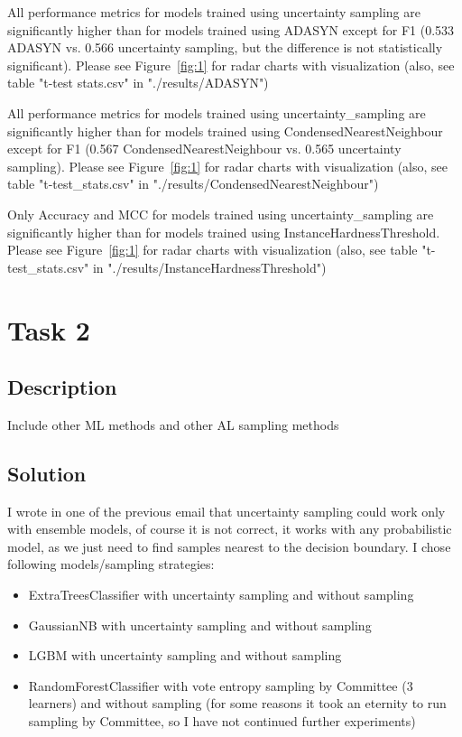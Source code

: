 \documentclass[a4paper,10pt]{article}
\begin{document}
All performance metrics for models trained using uncertainty sampling are significantly higher than for models trained using ADASYN except for F1 (0.533 ADASYN vs. 0.566 uncertainty sampling, but the difference is not statistically significant). Please see Figure~\ref{fig:1} for radar charts with visualization (also, see table "t-test stats.csv" in "./results/ADASYN")


All performance metrics for models trained using uncertainty\_sampling are significantly higher than for models trained using CondensedNearestNeighbour except for F1 (0.567 CondensedNearestNeighbour vs. 0.565 uncertainty sampling). Please see Figure~\ref{fig:1} for radar charts with visualization (also, see table "t-test\_stats.csv" in "./results/CondensedNearestNeighbour")


Only Accuracy and MCC for models trained using uncertainty\_sampling are significantly higher than for models trained using InstanceHardnessThreshold. Please see Figure~\ref{fig:1} for radar charts with visualization (also, see table "t-test\_stats.csv" in "./results/InstanceHardnessThreshold")


\section{Task 2}
\subsection{Description}
Include other ML methods and other AL sampling methods
\subsection{Solution}
I wrote in one of the previous email that uncertainty sampling could work only with ensemble models, of course it is not correct, it works with any probabilistic model, as we just need to find samples nearest to the decision boundary.
I chose following models/sampling strategies:
\begin{itemize}
    \item ExtraTreesClassifier with uncertainty sampling and without sampling
    \item GaussianNB with uncertainty sampling and without sampling
    \item LGBM with uncertainty sampling and without sampling
    \item RandomForestClassifier with vote entropy sampling by Committee (3 learners) and without sampling (for some reasons it took an eternity to run sampling by Committee, so I have not continued further experiments)
\end{itemize}
\end{document}

